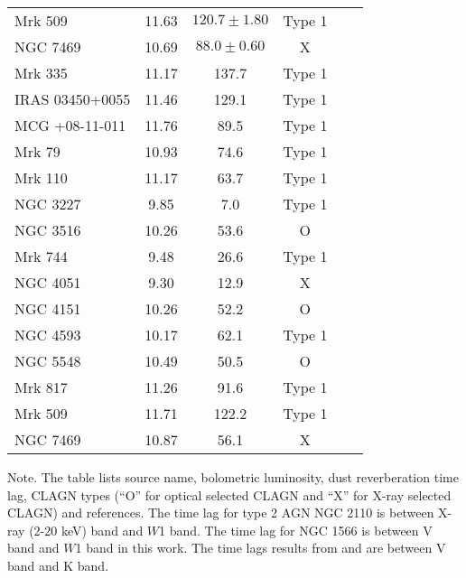 \begin{table}
\begin{center}
\begin{tabular}{lccccc}
Mrk 509 & 11.63 & $ 120.7 \pm 1.80$ & Type 1 & \citet{2014ApJ...788..159K} \\
NGC 7469 & 10.69 & $ 88.0 \pm 0.60$ & X & \citet{2014ApJ...788..159K} \\
Mrk 335 & 11.17 & 137.7 & Type 1 & \citet{2019ApJ...886...33L} \\
IRAS 03450+0055 & 11.46 & 129.1 & Type 1 & \citet{2019ApJ...886...33L} \\
MCG +08-11-011 & 11.76 & 89.5 & Type 1 & \citet{2019ApJ...886...33L} \\
Mrk 79 & 10.93 & 74.6 & Type 1 & \citet{2019ApJ...886...33L} \\
Mrk 110 & 11.17 & 63.7 & Type 1 & \citet{2019ApJ...886...33L} \\
NGC 3227 & 9.85 & 7.0 & Type 1 & \citet{2019ApJ...886...33L} \\
NGC 3516 & 10.26 & 53.6 & O & \citet{2019ApJ...886...33L} \\
Mrk 744 & 9.48 & 26.6 & Type 1 & \citet{2019ApJ...886...33L} \\
NGC 4051 & 9.30 & 12.9 & X & \citet{2019ApJ...886...33L} \\
NGC 4151 & 10.26 & 52.2 & O & \citet{2019ApJ...886...33L} \\
NGC 4593 & 10.17 & 62.1 & Type 1 & \citet{2019ApJ...886...33L} \\
NGC 5548 & 10.49 & 50.5 & O & \citet{2019ApJ...886...33L} \\
Mrk 817 & 11.26 & 91.6 & Type 1 & \citet{2019ApJ...886...33L} \\
Mrk 509 & 11.71 & 122.2 & Type 1 & \citet{2019ApJ...886...33L} \\
NGC 7469 & 10.87 & 56.1 & X & \citet{2019ApJ...886...33L} \\
\hline\hline
\end{tabular}
\end{center}
Note. The table lists source name, bolometric luminosity, dust reverberation time lag, CLAGN types (``O'' for optical selected CLAGN and ``X'' for X-ray selected CLAGN) and references. The time lag for type 2 AGN NGC 2110 is between X-ray (2-20 keV) band and $W$1 band. The time lag for NGC 1566 is between V band and $W$1 band in this work. The time lags results from \citet{2014ApJ...788..159K} and \citet{2019ApJ...886...33L} are between V band and K band. 
\end{table}

